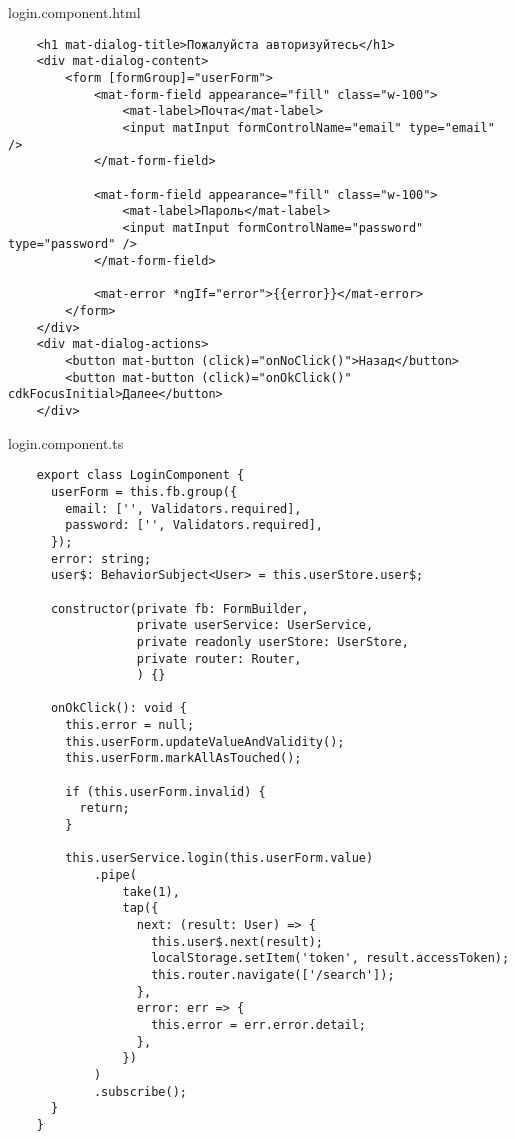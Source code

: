 login.component.html
\begin{lstlisting}
    <h1 mat-dialog-title>Пожалуйста авторизуйтесь</h1>
    <div mat-dialog-content>
        <form [formGroup]="userForm">
            <mat-form-field appearance="fill" class="w-100">
                <mat-label>Почта</mat-label>
                <input matInput formControlName="email" type="email" />
            </mat-form-field>
    
            <mat-form-field appearance="fill" class="w-100">
                <mat-label>Пароль</mat-label>
                <input matInput formControlName="password" type="password" />
            </mat-form-field>
    
            <mat-error *ngIf="error">{{error}}</mat-error>
        </form>
    </div>
    <div mat-dialog-actions>
        <button mat-button (click)="onNoClick()">Назад</button>
        <button mat-button (click)="onOkClick()" cdkFocusInitial>Далее</button>
    </div>    
\end{lstlisting}


login.component.ts
\begin{lstlisting}
    export class LoginComponent {
      userForm = this.fb.group({
        email: ['', Validators.required],
        password: ['', Validators.required],
      });
      error: string;
      user$: BehaviorSubject<User> = this.userStore.user$;
    
      constructor(private fb: FormBuilder,
                  private userService: UserService,
                  private readonly userStore: UserStore,
                  private router: Router,
                  ) {}
    
      onOkClick(): void {
        this.error = null;
        this.userForm.updateValueAndValidity();
        this.userForm.markAllAsTouched();
    
        if (this.userForm.invalid) {
          return;
        }
    
        this.userService.login(this.userForm.value)
            .pipe(
                take(1),
                tap({
                  next: (result: User) => {
                    this.user$.next(result);
                    localStorage.setItem('token', result.accessToken);
                    this.router.navigate(['/search']);
                  },
                  error: err => {
                    this.error = err.error.detail;
                  },
                })
            )
            .subscribe();
      }
    }    
\end{lstlisting}


